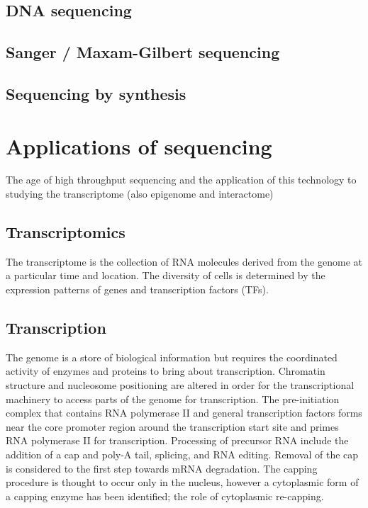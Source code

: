 \subsection{DNA sequencing}

\subsection{Sanger / Maxam-Gilbert sequencing}

\subsection{Sequencing by synthesis}

\section{Applications of sequencing}

The age of high throughput sequencing and the application of this technology to studying the transcriptome (also epigenome and interactome)

\subsection{Transcriptomics}

The transcriptome is the collection of RNA molecules derived from the genome at a particular time and location. The diversity of cells is determined by the expression patterns of genes and transcription factors (TFs).

\subsection{Transcription}

The genome is a store of biological information but requires the coordinated activity of enzymes and proteins to bring about transcription. Chromatin structure and nucleosome positioning are altered in order for the transcriptional machinery to access parts of the genome for transcription. The pre-initiation complex that contains RNA polymerase II and general transcription factors forms near the core promoter region around the transcription start site and primes RNA polymerase II for transcription. Processing of precursor RNA include the addition of a cap and poly-A tail, splicing, and RNA editing. Removal of the cap is considered to the first step towards mRNA degradation. The capping procedure is thought to occur only in the nucleus, however a cytoplasmic form of a capping enzyme has been identified; the role of cytoplasmic re-capping.

